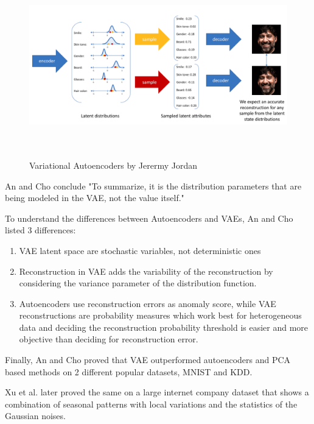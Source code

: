 \begin{figure}[ht]
    \hspace*{-1in}
    \centering
    \includegraphics[width = 17cm, height = 8cm]{images/vaes.png}
    \caption[]{Variational Autoencoders by Jerermy Jordan}
    \label{fig:vaes}
\end{figure}

An and Cho conclude "To summarize, it is the distribution parameters that are being modeled in the VAE, not the value itself."

To understand the differences between Autoencoders and VAEs, An and Cho listed 3 differences:

\begin{enumerate}
    \item VAE latent space are stochastic variables, not deterministic ones
    \item Reconstruction in VAE adds the variability of the reconstruction by considering the variance parameter of the distribution function.
    \item Autoencoders use reconstruction errors as anomaly score, while VAE reconstructions are probability measures which work best for heterogeneous data and deciding the reconstruction probability threshold is easier and more objective than deciding for reconstruction error.
\end{enumerate}

Finally, An and Cho proved that VAE outperformed autoencoders and PCA based methods on 2 different popular datasets, MNIST and KDD.

Xu et al. later proved the same on a large internet company dataset that shows a combination of seasonal patterns with local variations and the statistics of the Gaussian noises.

